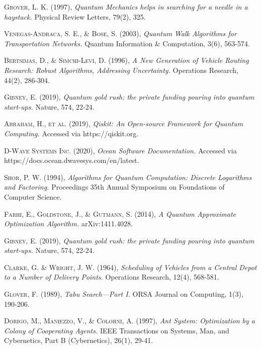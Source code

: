 \documentclass[11pt,a4paper,spanish]{book}
\begin{document}
\begin{itemize}
\begin{thebibliography}{a}
	 \textsc{Grover, L. K.} (1997),
	\textit{Quantum Mechanics helps in searching for a needle in a haystack.}
	Physical Review Letters, 79(2), 325.
	
	 \textsc{Venegas-Andraca, S. E., \& Bose, S.} (2003),
	\textit{Quantum Walk Algorithms for Transportation Networks.}
	Quantum Information \& Computation, 3(6), 563-574.
	
	 \textsc{Bertsimas, D., \& Simchi-Levi, D.} (1996),
	\textit{A New Generation of Vehicle Routing Research: Robust Algorithms, Addressing Uncertainty.}
	Operations Research, 44(2), 286-304.
	
	 \textsc{Gibney, E.} (2019),
	\textit{Quantum gold rush: the private funding pouring into quantum start-ups.}
	Nature, 574, 22-24.
	
	 \textsc{Abraham, H., et al.} (2019),
	\textit{Qiskit: An Open-source Framework for Quantum Computing.}
	Accessed via https://qiskit.org.
	
	 \textsc{D-Wave Systems Inc.} (2020),
	\textit{Ocean Software Documentation.}
	Accessed via https://docs.ocean.dwavesys.com/en/latest.
	
		
	 \textsc{Shor, P. W.} (1994),
	\textit{Algorithms for Quantum Computation: Discrete Logarithms and Factoring.}
	Proceedings 35th Annual Symposium on Foundations of Computer Science.
	
	 \textsc{Farhi, E., Goldstone, J., \& Gutmann, S.} (2014),
	\textit{A Quantum Approximate Optimization Algorithm.}
	arXiv:1411.4028.
	
	 \textsc{Gibney, E.} (2019),
	\textit{Quantum gold rush: the private funding pouring into quantum start-ups.}
	Nature, 574, 22-24.

	 \textsc{Clarke, G. \& Wright, J. W.} (1964),
	\textit{Scheduling of Vehicles from a Central Depot to a Number of Delivery Points.}
	Operations Research, 12(4), 568-581.
	
	 \textsc{Glover, F.} (1989),
	\textit{Tabu Search—Part I.}
	ORSA Journal on Computing, 1(3), 190-206.
	
	 \textsc{Dorigo, M., Maniezzo, V., \& Colorni, A.} (1997),
	\textit{Ant System: Optimization by a Colony of Cooperating Agents.}
	IEEE Transactions on Systems, Man, and Cybernetics, Part B (Cybernetics), 26(1), 29-41.
	

\end{thebibliography}
\end{itemize}
\end{document}
